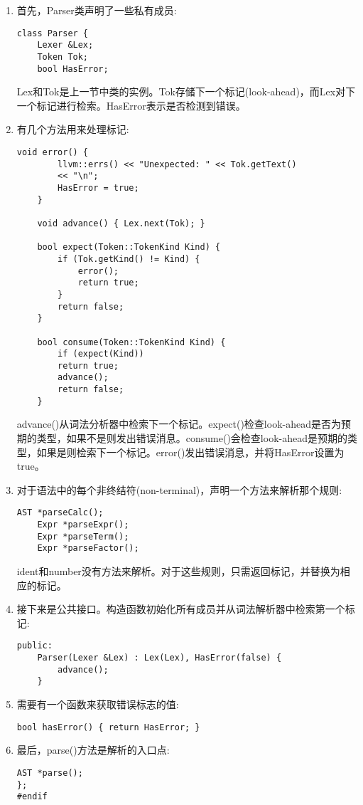 \begin{enumerate}
\item 首先，Parser类声明了一些私有成员:
\begin{lstlisting}[caption={}]
class Parser {
	Lexer &Lex;
	Token Tok;
	bool HasError;
\end{lstlisting}
Lex和Tok是上一节中类的实例。Tok存储下一个标记(look-ahead)，而Lex对下一个标记进行检索。HasError表示是否检测到错误。

\item 有几个方法用来处理标记:
\begin{lstlisting}[caption={}]
	void error() {
		llvm::errs() << "Unexpected: " << Tok.getText()
		<< "\n";
		HasError = true;
	}
	
	void advance() { Lex.next(Tok); }
	
	bool expect(Token::TokenKind Kind) {
		if (Tok.getKind() != Kind) {
			error();
			return true;
		}
		return false;
	}
	
	bool consume(Token::TokenKind Kind) {
		if (expect(Kind))
		return true;
		advance();
		return false;
	}
\end{lstlisting}
advance()从词法分析器中检索下一个标记。expect()检查look-ahead是否为预期的类型，如果不是则发出错误消息。consume()会检查look-ahead是预期的类型，如果是则检索下一个标记。error()发出错误消息，并将HasError设置为true。\par

\item 对于语法中的每个非终结符(non-terminal)，声明一个方法来解析那个规则:
\begin{lstlisting}[caption={}]
	AST *parseCalc();
	Expr *parseExpr();
	Expr *parseTerm();
	Expr *parseFactor();
\end{lstlisting}
\begin{tcolorbox}[colback=blue!5!white,colframe=blue!75!black, title=Note]
ident和number没有方法来解析。对于这些规则，只需返回标记，并替换为相应的标记。
\end{tcolorbox}

\item 接下来是公共接口。构造函数初始化所有成员并从词法解析器中检索第一个标记:
\begin{lstlisting}[caption={}]
	public:
	Parser(Lexer &Lex) : Lex(Lex), HasError(false) {
		advance();
	}
\end{lstlisting}

\item 需要有一个函数来获取错误标志的值:
\begin{lstlisting}[caption={}]
	bool hasError() { return HasError; }
\end{lstlisting}

\item 最后，parse()方法是解析的入口点:
\begin{lstlisting}[caption={}]
	AST *parse();
};
#endif
\end{lstlisting}
	
\end{enumerate}

